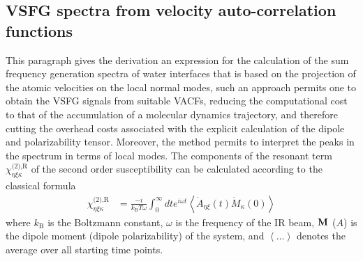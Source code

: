 \subsection{VSFG spectra from velocity auto-correlation functions}
This paragraph gives the derivation an expression for the calculation of the sum frequency generation spectra of water interfaces that is
based on the projection of the atomic velocities on the local normal modes, such an approach permits one to obtain the VSFG signals from suitable
VACFs, reducing the computational cost to that of the accumulation of a molecular dynamics trajectory, and therefore cutting 
the overhead costs associated with the explicit calculation of the dipole and polarizability tensor. Moreover, the method permits to interpret 
the peaks in the spectrum in terms of local modes.
The components of the resonant term $\chi^{\text{(2),R}}_{\eta\xi\kappa}$ of the second order susceptibility can be calculated 
according to the classical formula\cite{Morita2002,Morita2008,Nihonyanagi2011}
\begin{align}
  \chi^{\text{(2),R}}_{\eta\xi\kappa}&=\frac{-i}{k_{\text{B}}T \omega} \int_0^\infty dt e^{i\omega t}\left\langle \dot{A}_{\eta\xi}(t) \dot{M}_{\kappa}(0)\right\rangle 
 \label{eq:chi}
\end{align}
where $k_{\text{B}}$ is the Boltzmann constant, $\omega$ is the frequency of the IR beam, ${\bf M}$ (${A}$) is the dipole 
moment (dipole polarizability) of the system, and $\left\langle\dots\right\rangle$ denotes the average over all starting time points. 
 
